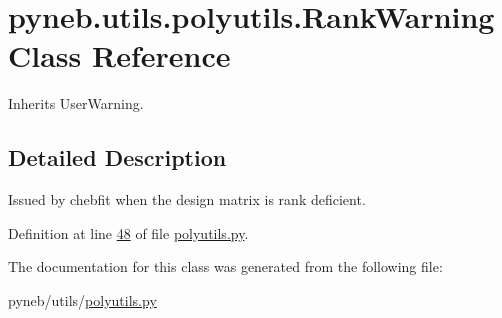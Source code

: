 \hypertarget{classpyneb_1_1utils_1_1polyutils_1_1_rank_warning}{}\section{pyneb.\+utils.\+polyutils.\+Rank\+Warning Class Reference}
\label{classpyneb_1_1utils_1_1polyutils_1_1_rank_warning}


Inherits User\+Warning.



\subsection{Detailed Description}
\begin{DoxyVerb}Issued by chebfit when the design matrix is rank deficient.\end{DoxyVerb}
 

Definition at line \hyperlink{polyutils_8py_source_l00048}{48} of file \hyperlink{polyutils_8py_source}{polyutils.\+py}.



The documentation for this class was generated from the following file\+:\begin{DoxyCompactItemize}
\item 
pyneb/utils/\hyperlink{polyutils_8py}{polyutils.\+py}\end{DoxyCompactItemize}
